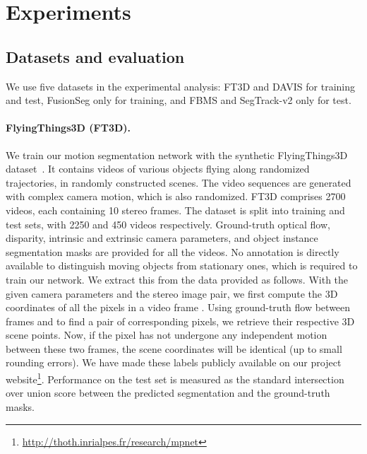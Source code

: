 \section{Experiments}

\subsection{Datasets and evaluation}
\label{sec:dataset}
We use five datasets in the experimental analysis: FT3D and DAVIS for training
and test, FusionSeg only for training, and FBMS and SegTrack-v2 only for test.

\paragraph{\bf FlyingThings3D (FT3D).} We train our motion segmentation network
with the synthetic FlyingThings3D dataset~\cite{Mayer16}. It contains videos of
various objects flying along randomized trajectories, in randomly constructed
scenes. The video sequences are generated with complex camera motion, which is
also randomized.  FT3D comprises 2700 videos, each containing 10 stereo frames.
The dataset is split into training and test sets, with 2250 and 450 videos
respectively.  Ground-truth optical flow, disparity, intrinsic and extrinsic
camera parameters, and object instance segmentation masks are provided for all
the videos. No annotation is directly available to distinguish moving objects
from stationary ones, which is required to train our network. We extract this
from the data provided as follows. With the given camera parameters and the
stereo image pair, we first compute the 3D coordinates of all the pixels in a
video frame . Using ground-truth flow between frames  and  to find a
pair of corresponding pixels, we retrieve their respective 3D scene points.
Now, if the pixel has not undergone any independent motion between these two
frames, the scene coordinates will be identical (up to small rounding errors).
We have made these labels publicly available on our project
website\footnote{\url{http://thoth.inrialpes.fr/research/mpnet}}. Performance on the test set is measured as the
standard intersection over union score between the predicted segmentation and
the ground-truth masks.

